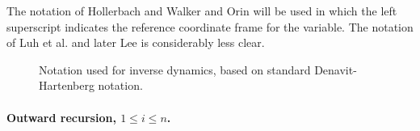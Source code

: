 \documentclass{article}
\newlength{\bigwidth}           %
\newcommand{\etal}{{et al.}}
\begin{document}
The notation of Hollerbach\cite{Hollerbach80} and Walker and Orin
\cite{Walker82} will be used in
which the left superscript indicates the reference coordinate
frame for the variable.  The notation of Luh \etal\cite{Luh80a}
and later Lee\cite{Lee82a,Fu87} is considerably less clear.

\begin{figure}
\centerline{}
\caption[Notation for inverse dynamics]{Notation used for
inverse dynamics, based on standard Denavit-Hartenberg notation.}
\label{fig:dynamics-notation}
\end{figure}

\paragraph{Outward recursion, $1\leq i\leq n$.}
\end{document}
